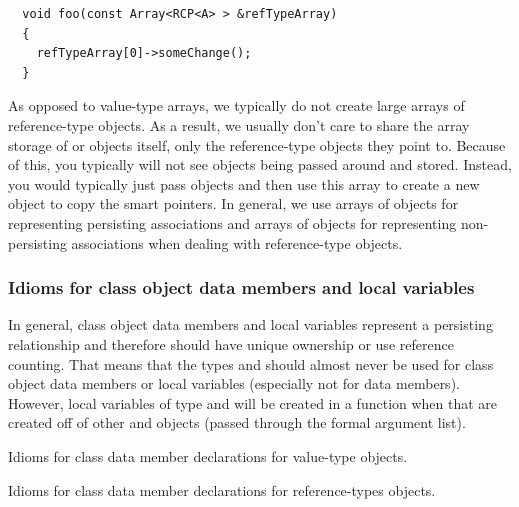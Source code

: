 \documentclass[pdf,ps2pdf,11pt]{SANDreport}
\begin{document}
{\small\begin{verbatim}
  void foo(const Array<RCP<A> > &refTypeArray)
  {
    refTypeArray[0]->someChange();
  }
\end{verbatim}}

As opposed to value-type arrays, we typically do not create large
arrays of reference-type objects.  As a result, we usually don't care
to share the array storage of {} or {} objects
itself, only the reference-type objects they point to.  Because of
this, you typically will not see {} objects being passed around and stored.  Instead,
you would typically just pass {} objects and then use this array to create a new
{} object to copy the smart
pointers.  In general, we use arrays of {} objects for
representing persisting associations and arrays of {}
objects for representing non-persisting associations when dealing with
reference-type objects.


%
{}\subsubsection{Idioms for class object data members and local
variables}
%

In general, class object data members and local variables represent a
persisting relationship and therefore should have unique ownership or
use reference counting.  That means that the types {} and
{} should almost never be used for class object data
members or local variables (especially not for data members).
However, local variables of type {} and
{} will be created in a function when that are
created off of other {} and {} objects
(passed through the formal argument list).

\begin{table}
%
\begin{center}
%
%

%
%
\end{center}
\caption{\label{fig:data_member_value_type}
Idioms for class data member declarations for value-type objects.}
%
\end{table}

\begin{table}
%
\begin{center}
%
%

%
%
\end{center}
\caption{\label{fig:data_member_reference_type}
Idioms for class data member declarations for reference-types
objects.}
%
\end{table}
\end{document}
